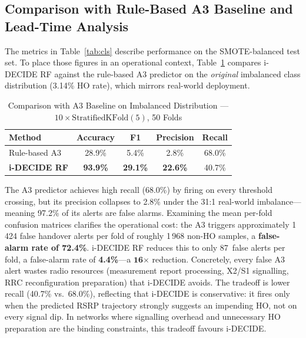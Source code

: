 \documentclass[journal]{IEEEtran}
\begin{document}
\subsection{Comparison with Rule-Based A3 Baseline and Lead-Time Analysis}
\label{sec:leadtime}

The metrics in Table~\ref{tab:cls} describe performance on the
SMOTE-balanced test set. To place those figures in an operational context,
Table~\ref{tab:a3compare} compares i-DECIDE RF against the rule-based
A3 predictor on the \emph{original} imbalanced class distribution
(3.14\% HO rate), which mirrors real-world deployment.

\begin{table}[!t]
\caption{Comparison with A3 Baseline on Imbalanced Distribution ---
$10\times\text{StratifiedKFold}(5)$, 50 Folds}
\label{tab:a3compare}
\centering
\renewcommand{\arraystretch}{1.15}
\begin{tabular}{lcccc}
\toprule
\textbf{Method} &
  \textbf{Accuracy} & \textbf{F1} & \textbf{Precision} & \textbf{Recall} \\
\midrule
Rule-based A3   & 28.9\% & 5.4\%  & 2.8\%  & 68.0\% \\
\textbf{i-DECIDE RF} & \textbf{93.9\%} & \textbf{29.1\%} & \textbf{22.6\%} & 40.7\% \\
\bottomrule
\end{tabular}
\end{table}

The A3 predictor achieves high recall (68.0\%) by firing on every
threshold crossing, but its precision collapses to 2.8\% under the
31:1 real-world imbalance---meaning 97.2\% of its alerts are false
alarms. Examining the mean per-fold confusion matrices clarifies the
operational cost: the A3 triggers approximately 1\,424 false handover
alerts per fold of roughly 1\,968 non-HO samples, a \textbf{false-alarm
rate of 72.4\%}. i-DECIDE RF reduces this to only 87~false alerts per
fold, a false-alarm rate of \textbf{4.4\%}---a $\mathbf{16}\boldsymbol{\times}$
reduction. Concretely, every false A3 alert wastes radio resources
(measurement report processing, X2/S1 signalling, RRC reconfiguration
preparation) that i-DECIDE avoids. The tradeoff is lower recall
(40.7\% vs.\ 68.0\%), reflecting that i-DECIDE is conservative: it
fires only when the predicted RSRP trajectory strongly suggests an
impending HO, not on every signal dip. In networks where signalling
overhead and unnecessary HO preparation are the binding constraints,
this tradeoff favours i-DECIDE.
\end{document}
